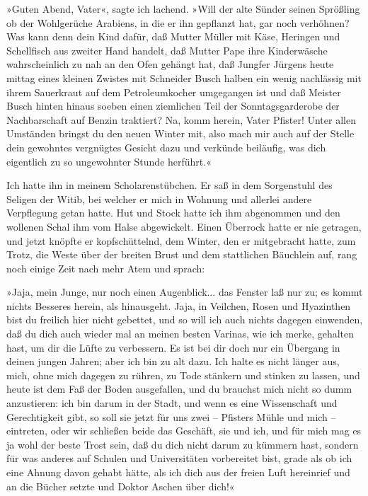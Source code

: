 »Guten Abend, Vater«, sagte ich lachend. »Will der alte Sünder
seinen Sprößling ob der Wohlgerüche Arabiens, in die er ihn
gepflanzt hat, gar noch verhöhnen? Was kann denn dein Kind dafür,
daß Mutter Müller mit Käse, Heringen und Schellfisch aus zweiter
Hand handelt, daß Mutter Pape ihre Kinderwäsche wahrscheinlich zu
nah an den Ofen gehängt hat, daß Jungfer Jürgens heute mittag eines
kleinen Zwistes mit Schneider Busch halben ein wenig nachlässig mit
ihrem Sauerkraut auf dem Petroleumkocher umgegangen ist und daß
Meister Busch hinten hinaus soeben einen ziemlichen Teil der
Sonntagsgarderobe der Nachbarschaft auf Benzin traktiert? Na, komm
herein, Vater Pfister! Unter allen Umständen bringst du den neuen
Winter mit, also mach mir auch auf der Stelle dein gewohntes
vergnügtes Gesicht dazu und verkünde beiläufig, was dich eigentlich
zu so ungewohnter Stunde herführt.«

Ich hatte ihn in meinem Scholarenstübchen. Er saß in dem
Sorgenstuhl des Seligen der Witib, bei welcher er mich in Wohnung
und allerlei andere Verpflegung getan hatte. Hut und Stock hatte
ich ihm abgenommen und den wollenen Schal ihm vom Halse
abgewickelt. Einen Überrock hatte er nie getragen, und jetzt
knöpfte er kopfschüttelnd, dem Winter, den er mitgebracht hatte,
zum Trotz, die Weste über der breiten Brust und dem stattlichen
Bäuchlein auf, rang noch einige Zeit nach mehr Atem und sprach:

»Jaja, mein Junge, nur noch einen Augenblick... das Fenster laß nur
zu; es kommt nichts Besseres herein, als hinausgeht. Jaja, in
Veilchen, Rosen und Hyazinthen bist du freilich hier nicht
gebettet, und so will ich auch nichts dagegen einwenden, daß du
dich auch wieder mal an meinen besten Varinas, wie ich merke,
gehalten hast, um dir die Lüfte zu verbessern. Es ist bei dir doch
nur ein Übergang in deinen jungen Jahren; aber ich bin zu alt dazu.
Ich halte es nicht länger aus, mich, ohne mich dagegen zu rühren,
zu Tode stänkern und stinken zu lassen, und heute ist dem Faß der
Boden ausgefallen, und du brauchst mich nicht so dumm anzustieren:
ich bin darum in der Stadt, und wenn es eine Wissenschaft und
Gerechtigkeit gibt, so soll sie jetzt für uns zwei – Pfisters Mühle
und mich – eintreten, oder wir schließen beide das Geschäft, sie
und ich, und für mich mag es ja wohl der beste Trost sein, daß du
dich nicht darum zu kümmern hast, sondern für was anderes auf
Schulen und Universitäten vorbereitet bist, grade als ob ich eine
Ahnung davon gehabt hätte, als ich dich aus der freien Luft
hereinrief und an die Bücher setzte und Doktor Aschen über dich!«

